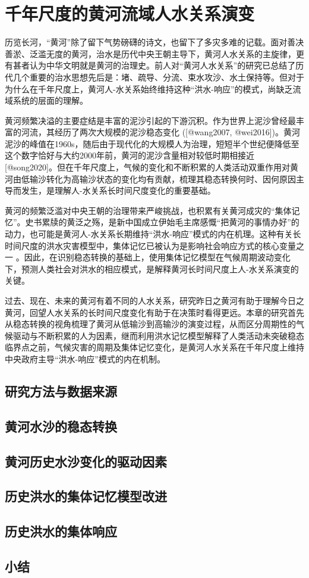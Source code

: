 \chapter{千年尺度的黄河流域人水关系演变}
\label{cha:3}

历览长河，“黄河”除了留下气势磅礴的诗文，也留下了多灾多难的记载。面对善决善淤、泛滥无度的黄河，治水是历代中央王朝主导下，黄河人水关系的主旋律，更有甚者认为中华文明就是黄河的治理史。前人对“黄河人水关系”的研究已总结了历代几个重要的治水思想先后是：堵、疏导、分流、束水攻沙、水土保持等。但对于为什么在千年尺度上，黄河人-水关系始终维持这种“洪水-响应”的模式，尚缺乏流域系统的层面的理解。

黄河频繁决溢的主要症结是丰富的泥沙引起的下游沉积。作为世界上泥沙曾经最丰富的河流，其经历了两次大规模的泥沙稳态变化 ([@wang2007, @wei2016])。黄河泥沙的峰值在1960s，随后由于现代化的大规模人为治理，短短半个世纪便降低至 %
这个数字恰好与大约2000年前，黄河的泥沙含量相对较低时期相接近 [@song2020]。但在千年尺度上，气候的变化和不断积累的人类活动双重作用对黄河由低输沙转化为高输沙状态的变化均有贡献，梳理其稳态转换何时、因何原因主导而发生，是理解人-水关系长时间尺度变化的重要基础。

黄河的频繁泛滥对中央王朝的治理带来严峻挑战，也积累有关黄河成灾的“集体记忆”。史书累牍的黄泛之殇，是新中国成立伊始毛主席感慨“把黄河的事情办好”的动力，也可能是黄河人-水关系长期维持“洪水-响应”模式的内在机理。这种有关长时间尺度的洪水灾害模型中，集体记忆已被认为是影响社会响应方式的核心变量之一 
\cite{dibaldassarre2015, dibaldassarre2019,ciullo2017}。因此，在识别稳态转换的基础上，使用集体记忆模型在气候周期波动变化下，预测人类社会对洪水的相应模式，是解释黄河长时间尺度上人-水关系演变的关键。

过去、现在、未来的黄河有着不同的人水关系，研究昨日之黄河有助于理解今日之黄河，回望人水关系的长时间尺度变化有助于在决策时看得更远。本章的研究首先从稳态转换的视角梳理了黄河从低输沙到高输沙的演变过程，从而区分周期性的气候驱动与不断积累的人为因素，继而利用洪水记忆模型解释了人类活动未突破稳态临界点之前，气候灾害的周期及集体记忆变化，是黄河人水关系在千年尺度上维持中央政府主导“洪水-响应”模式的内在机制。

\section{研究方法与数据来源}

\section{黄河水沙的稳态转换}

\section{黄河历史水沙变化的驱动因素}

\section{历史洪水的集体记忆模型改进}

\section{历史洪水的集体响应}

\section{小结}